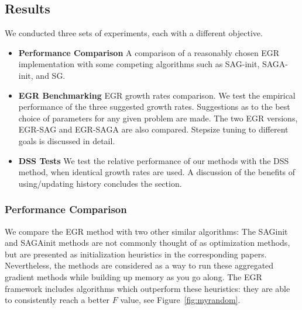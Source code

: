\documentclass[11pt]{article}
\begin{document}


   
  
   
   \subsection{Results}

   We conducted three sets of experiments, each with a different objective. 
   \begin{itemize}
   	\item \textbf{Performance Comparison} A comparison of a reasonably chosen EGR implementation with some competing algorithms such as SAG-init, SAGA-init, and SG.
    \item \textbf{EGR Benchmarking} EGR growth rates comparison. We test the empirical performance of the three suggested growth rates. Suggestions as to the best choice of parameters for any given problem are made. The two EGR versions, EGR-SAG and EGR-SAGA are also compared. Stepsize tuning to different goals is discussed in detail.  
    \item \textbf{DSS Tests} We test the relative performance of our methods with the DSS method, when identical growth rates are used. A discussion of the benefits of using/updating history concludes the section.
   \end{itemize}
   
   \subsubsection{Performance Comparison}   
    
	
   
    We compare the EGR method with two other similar algorithms: The SAGinit and SAGAinit methods are not commonly thought of as optimization methods, but are presented as initialization heuristics in the corresponding papers. Nevertheless, the methods are considered as a way to run these aggregated gradient methods while building up memory as you go along. The EGR framework includes algorithms which outperform these heuristics: they are able to consistently reach a better $F$ value, see Figure~\ref{fig:myrandom}.
	
\end{document}
